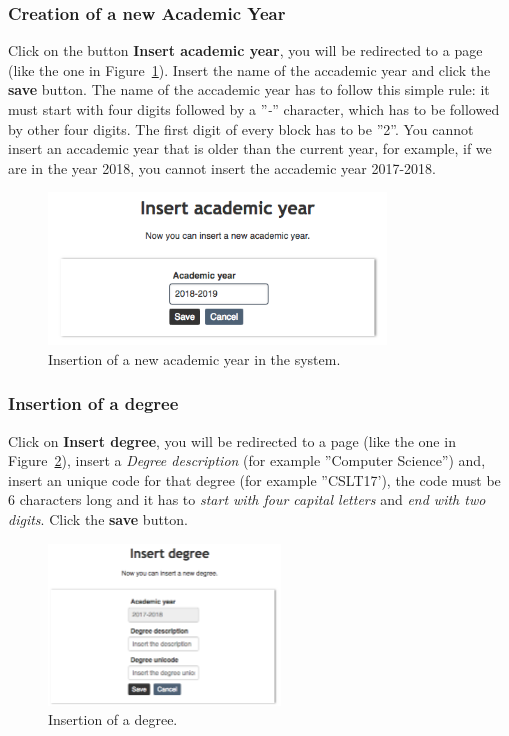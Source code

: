 \subsubsection{Creation of a new Academic Year}
Click on the button \textbf{Insert academic year}, you will be redirected to a page (like the one in Figure~\ref{fig:academicYInsertion}). Insert the name of the accademic year and click the \textbf{save} button. The name of the accademic year has to follow this simple rule: it must start with four digits followed by a ''\emph{-}'' character, which has to be	 followed by other four digits. The first digit of every block has to be ''2''. You cannot insert an accademic year that is older than the current year, for example, if we are in the year 2018, you cannot insert the accademic year 2017-2018.
\begin{figure}[!h]
	\centering
	\includegraphics[width=0.80\textwidth]{img/academicYInsertion.png}
	\caption{Insertion of a new academic year in the system.}
	\label{fig:academicYInsertion}
\end{figure}

\subsubsection{Insertion of a degree} \label{sssec:degIns}
Click on \textbf{Insert degree}, you will be redirected to a page (like the one in Figure~\ref{fig:degreeInsertion}), insert a \emph{Degree description}  (for example ''Computer Science'') and, insert an unique code for that degree (for example ''CSLT17'), the code must be 6 characters long and it has to \emph{start with four capital letters} and \emph{end with two digits}. Click the \textbf{save} button.
\begin{figure}[!h]
  \centering
  \includegraphics[width=0.55\textwidth]{img/degreeInsertion.png}
  \caption{Insertion of a degree.}
  \label{fig:degreeInsertion}
\end{figure}


